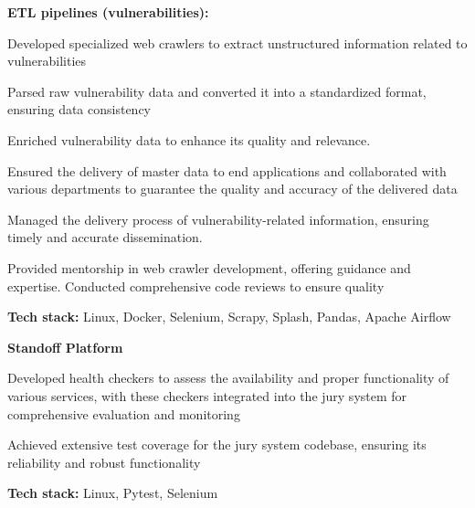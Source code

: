 \documentclass[a4paper]{MagicalCV}
\begin{document}
\begin{minipage}[t]{0.64\textwidth}
\textbf{ETL pipelines (vulnerabilities):}
\begin{tightemize}
  \item Developed specialized web crawlers to extract unstructured information related to vulnerabilities
  \item Parsed raw vulnerability data and converted it into a standardized format, ensuring data consistency
  \item Enriched vulnerability data to enhance its quality and relevance.
  \item Ensured the delivery of master data to end applications and collaborated with various departments to guarantee the quality and accuracy of the delivered data
  \item Managed the delivery process of vulnerability-related information, ensuring timely and accurate dissemination.
  \item Provided mentorship in web crawler development, offering guidance and expertise. Conducted comprehensive code reviews to ensure quality
\end{tightemize}
\textbf{Tech stack:} Linux, Docker, Selenium, Scrapy, Splash, Pandas, Apache Airflow

\textbf{Standoff Platform}
\begin{tightemize}
  \item Developed health checkers to assess the availability and proper functionality of various services, with these checkers integrated into the jury system for comprehensive evaluation and monitoring
  \item Achieved extensive test coverage for the jury system codebase, ensuring its reliability and robust functionality
\end{tightemize}
\textbf{Tech stack:} Linux, Pytest, Selenium
\sectionsep


\end{minipage} 
\end{document}
